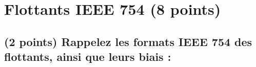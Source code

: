 \documentclass[11pt,a4paper]{article}
\begin{document}
\smallskip




\clearpage


\section{Flottants IEEE 754 (8 points)}

\subsection{(2 points) Rappelez les formats IEEE 754 des flottants, ainsi que leurs biais : }

\smallskip
\end{document}
